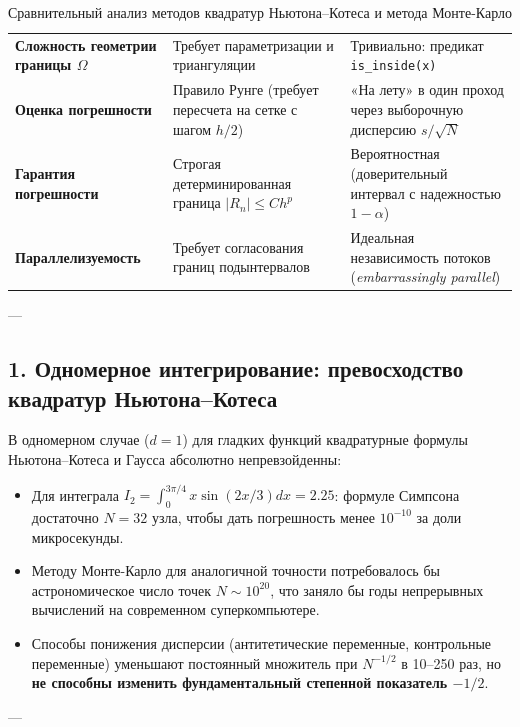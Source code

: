 \documentclass[11pt,a4paper]{article}
\begin{document}
\begin{table}[h!]
\begin{tabularx}{\textwidth}{p{3.8cm} X X}
\addlinespace
\textbf{Сложность геометрии границы $\Omega$} & Требует параметризации и триангуляции & Тривиально: предикат \texttt{is\_inside(x)} \\
\addlinespace
\textbf{Оценка погрешности} & Правило Рунге (требует пересчета на сетке с шагом $h/2$) & «На лету» в один проход через выборочную дисперсию $s / \sqrt{N}$ \\
\addlinespace
\textbf{Гарантия погрешности} & Строгая детерминированная граница $|R_n| \le C h^p$ & Вероятностная (доверительный интервал с надежностью $1-\alpha$) \\
\addlinespace
\textbf{Параллелизуемость} & Требует согласования границ подынтервалов & Идеальная независимость потоков (\textit{embarrassingly parallel}) \\
\bottomrule
\end{tabularx}
\caption{Сравнительный анализ методов квадратур Ньютона--Котеса и метода Монте-Карло}
\end{table}

---

\subsection{1. Одномерное интегрирование: превосходство квадратур Ньютона--Котеса}
В одномерном случае ($d=1$) для гладких функций квадратурные формулы Ньютона--Котеса и Гаусса абсолютно непревзойденны:
\begin{itemize}
    \item Для интеграла $I_2 = \int_0^{3\pi/4} x \sin(2x/3) dx = 2.25$: формуле Симпсона достаточно $N = 32$ узла, чтобы дать погрешность менее $10^{-10}$ за доли микросекунды.
    \item Методу Монте-Карло для аналогичной точности потребовалось бы астрономическое число точек $N \sim 10^{20}$, что заняло бы годы непрерывных вычислений на современном суперкомпьютере.
    \item Способы понижения дисперсии (антитетические переменные, контрольные переменные) уменьшают постоянный множитель при $N^{-1/2}$ в 10--250 раз, но \textbf{не способны изменить фундаментальный степенной показатель $-1/2$}.
\end{itemize}

---
\end{document}
